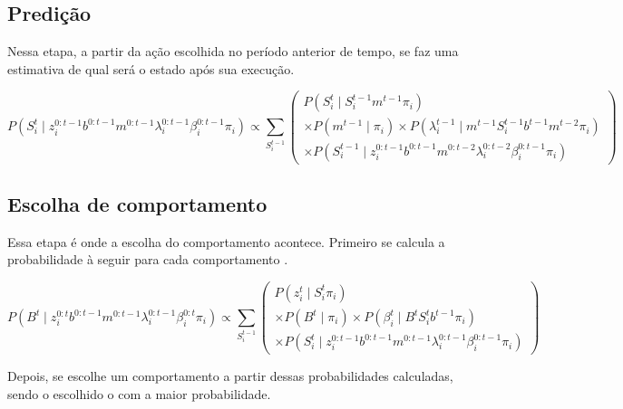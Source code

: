 \subsection{Predição}

Nessa etapa, a partir da ação escolhida no período anterior de tempo, se faz uma estimativa de qual será o estado após sua execução.

\begin{equation}
    P \left( S_i^t \mid z_i^{0: t-1} b^{0: t-1} m^{0: t-1} \lambda_i^{0: t-1} \beta_i^{0: t-1} \pi_i \right) \propto \sum\limits_{S_i^{t-1}}
        \left(
            \begin{array}{l}
                P \left( S_i^t \mid S_i^{t-1} m^{t-1} \pi_i \right) \\
                \times P \left( m^{t-1} \mid \pi_i \right) \times P \left( \lambda_i^{t-1} \mid m^{t-1} S_i^{t-1} b^{t-1} m^{t-2} \pi_i \right)\\
                \times P \left( S_i^{t-1} \mid z_i^{0: t-1} b^{0: t-1} m^{0: t-2} \lambda_i^{0: t-2} \beta_i^{0: t-1} \pi_i \right)
            \end{array}
        \right)
\end{equation}


\subsection{Escolha de comportamento}

Essa etapa é onde a escolha do comportamento acontece. Primeiro se calcula a probabilidade à seguir para cada comportamento .

\begin{equation}
    P \left( B^t \mid z_i^{0: t} b^{0: t-1} m^{0: t-1} \lambda_i^{0: t-1} \beta_i^{0: t} \pi_i \right) \propto \sum\limits_{S_i^{t-1}}
        \left(
            \begin{array}{l}
                P \left( z_i^t \mid S_i^t \pi_i \right) \\
                \times P \left( B^t \mid \pi_i \right) \times   P \left( \beta_i^t \mid B^t S_i^t b^{t-1} \pi_i \right) \\
                \times P \left( S_i^t \mid z_i^{0: t-1} b^{0: t-1} m^{0: t-1} \lambda_i^{0: t-1} \beta_i^{0: t-1} \pi_i \right)
            \end{array}
        \right)
\end{equation}

Depois, se escolhe um comportamento a partir dessas probabilidades calculadas, sendo o escolhido o com a maior probabilidade.


